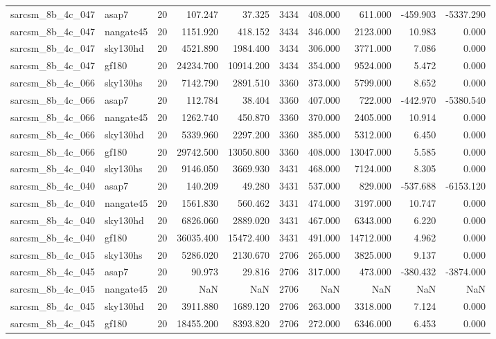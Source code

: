 \begin{tabular}{llrrrrrrrr}
sarcsm\_8b\_4c\_047 & asap7 & 20 & 107.247 & 37.325 & 3434 & 408.000 & 611.000 & -459.903 & -5337.290 \\
sarcsm\_8b\_4c\_047 & nangate45 & 20 & 1151.920 & 418.152 & 3434 & 346.000 & 2123.000 & 10.983 & 0.000 \\
sarcsm\_8b\_4c\_047 & sky130hd & 20 & 4521.890 & 1984.400 & 3434 & 306.000 & 3771.000 & 7.086 & 0.000 \\
sarcsm\_8b\_4c\_047 & gf180 & 20 & 24234.700 & 10914.200 & 3434 & 354.000 & 9524.000 & 5.472 & 0.000 \\
sarcsm\_8b\_4c\_066 & sky130hs & 20 & 7142.790 & 2891.510 & 3360 & 373.000 & 5799.000 & 8.652 & 0.000 \\
sarcsm\_8b\_4c\_066 & asap7 & 20 & 112.784 & 38.404 & 3360 & 407.000 & 722.000 & -442.970 & -5380.540 \\
sarcsm\_8b\_4c\_066 & nangate45 & 20 & 1262.740 & 450.870 & 3360 & 370.000 & 2405.000 & 10.914 & 0.000 \\
sarcsm\_8b\_4c\_066 & sky130hd & 20 & 5339.960 & 2297.200 & 3360 & 385.000 & 5312.000 & 6.450 & 0.000 \\
sarcsm\_8b\_4c\_066 & gf180 & 20 & 29742.500 & 13050.800 & 3360 & 408.000 & 13047.000 & 5.585 & 0.000 \\
sarcsm\_8b\_4c\_040 & sky130hs & 20 & 9146.050 & 3669.930 & 3431 & 468.000 & 7124.000 & 8.305 & 0.000 \\
sarcsm\_8b\_4c\_040 & asap7 & 20 & 140.209 & 49.280 & 3431 & 537.000 & 829.000 & -537.688 & -6153.120 \\
sarcsm\_8b\_4c\_040 & nangate45 & 20 & 1561.830 & 560.462 & 3431 & 474.000 & 3197.000 & 10.747 & 0.000 \\
sarcsm\_8b\_4c\_040 & sky130hd & 20 & 6826.060 & 2889.020 & 3431 & 467.000 & 6343.000 & 6.220 & 0.000 \\
sarcsm\_8b\_4c\_040 & gf180 & 20 & 36035.400 & 15472.400 & 3431 & 491.000 & 14712.000 & 4.962 & 0.000 \\
sarcsm\_8b\_4c\_045 & sky130hs & 20 & 5286.020 & 2130.670 & 2706 & 265.000 & 3825.000 & 9.137 & 0.000 \\
sarcsm\_8b\_4c\_045 & asap7 & 20 & 90.973 & 29.816 & 2706 & 317.000 & 473.000 & -380.432 & -3874.000 \\
sarcsm\_8b\_4c\_045 & nangate45 & 20 & NaN & NaN & 2706 & NaN & NaN & NaN & NaN \\
sarcsm\_8b\_4c\_045 & sky130hd & 20 & 3911.880 & 1689.120 & 2706 & 263.000 & 3318.000 & 7.124 & 0.000 \\
sarcsm\_8b\_4c\_045 & gf180 & 20 & 18455.200 & 8393.820 & 2706 & 272.000 & 6346.000 & 6.453 & 0.000 \\

\end{tabular}
